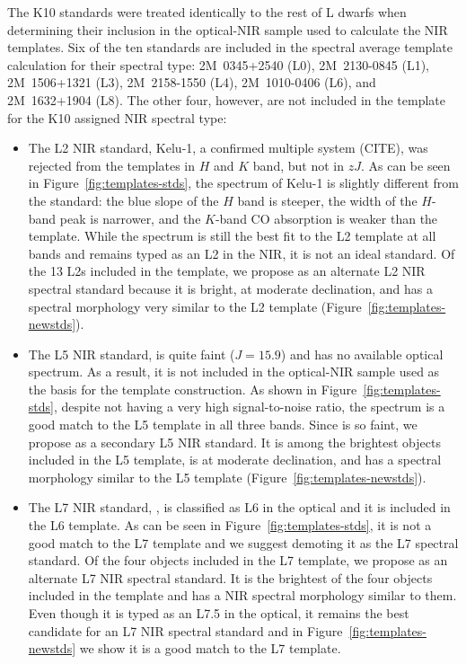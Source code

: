 \documentclass[12pt,preprint]{aastex}
\begin{document}
The K10 standards were treated identically to the rest of L dwarfs when determining their inclusion in the optical-NIR sample used to calculate the NIR templates. 
Six of the ten standards are included in the spectral average template calculation for their spectral type: 2M~0345+2540 (L0), 2M~2130-0845 (L1), 2M~1506+1321 (L3), 2M~2158-1550 (L4), 2M~1010-0406 (L6), and 2M~1632+1904 (L8).
The other four, however, are not included in the template for the K10 assigned NIR spectral type:
\begin{itemize}

	\item The L2 NIR standard,  Kelu-1, a confirmed multiple system (CITE), was rejected from the templates in $H$ and $K$ band, but not in $zJ$. As can be seen in Figure~\ref{fig:templates-stds}, the spectrum of Kelu-1 is slightly different from the standard: the blue slope of the $H$ band is steeper, the width of the $H$-band peak is narrower, and the $K$-band CO absorption is weaker than the template. While the spectrum is still the best fit to the L2 template at all bands and remains typed as an L2 in the NIR, it is not an ideal standard. Of the 13 L2s included in the template, we propose  as an alternate L2 NIR spectral standard because it is bright, at moderate declination, and has a spectral morphology very similar to the L2 template (Figure~\ref{fig:templates-newstds}).

	\item The L5 NIR standard,  is quite faint ($J=15.9$) and has no available optical spectrum. As a result, it is not included in the optical-NIR sample used as the basis for the template construction. As shown in Figure~\ref{fig:templates-stds}, despite not having a very high signal-to-noise ratio, the spectrum is a good match to the L5 template in all three bands. Since  is so faint, we propose  as a secondary L5 NIR standard. It is among the brightest objects included in the L5 template, is at moderate declination, and has a spectral morphology similar to the L5 template (Figure~\ref{fig:templates-newstds}). 

	\item The L7 NIR standard, , is classified as L6 in the optical \cite{K00} and it is included in the L6 template. 
	As can be seen in Figure~\ref{fig:templates-stds}, it is not a good match to the L7 template and we suggest demoting it as the L7 spectral standard. 
	Of the four objects included in the L7 template, we propose  as an alternate L7 NIR spectral standard. 
	It is the brightest of the four objects included in the template and has a NIR spectral morphology similar to them. 
	Even though it is typed as an L7.5 in the optical, it remains the best candidate for an L7 NIR spectral standard and in Figure~\ref{fig:templates-newstds} we show it is a good match to the L7 template.	
		

\end{itemize}
\end{document}
